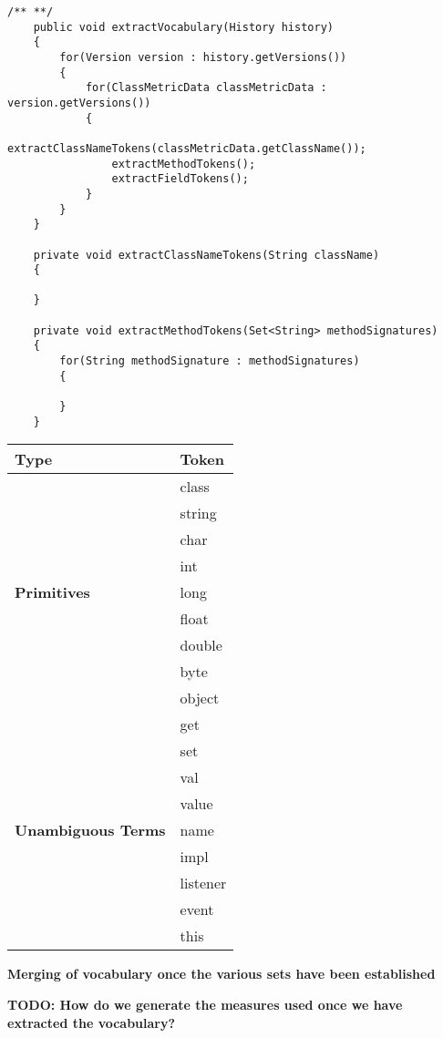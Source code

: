 \begin{lstlisting}[caption={Same of bytecode generated for a simple Hello World method}, label={BytecodeExample}, float=t]
	/** **/
	public void extractVocabulary(History history)
	{
		for(Version version : history.getVersions())
		{
			for(ClassMetricData classMetricData : version.getVersions())
			{
				extractClassNameTokens(classMetricData.getClassName());
				extractMethodTokens();
				extractFieldTokens();
			}
		}
	}
	
	private void extractClassNameTokens(String className)
	{
		
	}
	
	private void extractMethodTokens(Set<String> methodSignatures)
	{
		for(String methodSignature : methodSignatures)
		{
			
		}
	}
\end{lstlisting}

\begin{table*}[t]
\centering
\begin{tabular}{|p{}|p{}|}
\hline
{\bf Type} & {\bf Token}\\ \hline
\multirow{9}{*}{\bf Primitives}
& class \\
& string \\
& char \\
& int \\
& long \\
& float \\
& double \\
& byte \\
& object \\
\hline
\multirow{9}{*}{\bf Unambiguous Terms}
& get \\
& set \\
& val \\
& value \\
& name \\
& impl \\
& listener \\
& event \\
& this \\
\hline
\end{tabular}
\label{tab:NotHistories}
\end{table*}

\textbf{Merging of vocabulary once the various sets have been established}

\textbf{TODO: How do we generate the measures used once we have extracted the vocabulary?}

